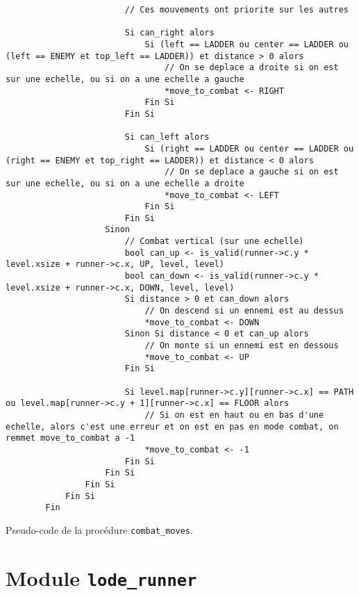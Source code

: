 \begin{longlisting}
\begin{verbatim}
                        // Ces mouvements ont priorite sur les autres

                        Si can_right alors
                            Si (left == LADDER ou center == LADDER ou (left == ENEMY et top_left == LADDER)) et distance > 0 alors
                                // On se deplace a droite si on est sur une echelle, ou si on a une echelle a gauche
                                *move_to_combat <- RIGHT
                            Fin Si
                        Fin Si

                        Si can_left alors
                            Si (right == LADDER ou center == LADDER ou (right == ENEMY et top_right == LADDER)) et distance < 0 alors
                                // On se deplace a gauche si on est sur une echelle, ou si on a une echelle a droite
                                *move_to_combat <- LEFT
                            Fin Si
                        Fin Si
                    Sinon
                        // Combat vertical (sur une echelle)
                        bool can_up <- is_valid(runner->c.y * level.xsize + runner->c.x, UP, level, level)
                        bool can_down <- is_valid(runner->c.y * level.xsize + runner->c.x, DOWN, level, level)
                        Si distance > 0 et can_down alors
                            // On descend si un ennemi est au dessus
                            *move_to_combat <- DOWN
                        Sinon Si distance < 0 et can_up alors
                            // On monte si un ennemi est en dessous
                            *move_to_combat <- UP
                        Fin Si

                        Si level.map[runner->c.y][runner->c.x] == PATH ou level.map[runner->c.y + 1][runner->c.x] == FLOOR alors
                            // Si on est en haut ou en bas d'une echelle, alors c'est une erreur et on est en pas en mode combat, on remmet move_to_combat a -1
                            *move_to_combat <- -1
                        Fin Si
                    Fin Si
                Fin Si
            Fin Si
        Fin
    \end{verbatim}
    \caption{Pseudo-code de la procédure \texttt{combat\_moves}.}
    \label{listing:c-combat_moves}
\end{longlisting}

\newpage

\section{Module \texttt{lode\_runner}}


